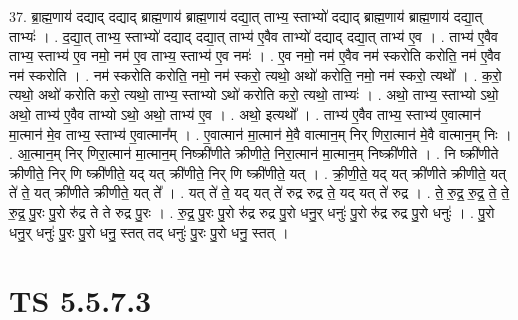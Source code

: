 \documentclass[17pt]{extarticle}
\begin{document}
37. ब्रा॒ह्म॒णाय॑ दद्याद् दद्याद् ब्राह्म॒णाय॑ ब्राह्म॒णाय॑ दद्या॒त् ताभ्य॒ स्ताभ्यो॑ दद्याद् ब्राह्म॒णाय॑ ब्राह्म॒णाय॑ दद्या॒त् ताभ्यः॑ । . द॒द्या॒त् ताभ्य॒ स्ताभ्यो॑ दद्याद् दद्या॒त् ताभ्य॑ ए॒वैव ताभ्यो॑ दद्याद् दद्या॒त् ताभ्य॑ ए॒व । . ताभ्य॑ ए॒वैव ताभ्य॒ स्ताभ्य॑ ए॒व नमो॒ नम॑ ए॒व ताभ्य॒ स्ताभ्य॑ ए॒व नमः॑ । . ए॒व नमो॒ नम॑ ए॒वैव नम॑ स्करोति करोति॒ नम॑ ए॒वैव नम॑ स्करोति । . नम॑ स्करोति करोति॒ नमो॒ नम॑ स्करो॒ त्यथो॒ अथो॑ करोति॒ नमो॒ नम॑ स्करो॒ त्यथो᳚ । . क॒रो॒ त्यथो॒ अथो॑ करोति करो॒ त्यथो॒ ताभ्य॒ स्ताभ्यो ऽथो॑ करोति करो॒ त्यथो॒ ताभ्यः॑ । . अथो॒ ताभ्य॒ स्ताभ्यो ऽथो॒ अथो॒ ताभ्य॑ ए॒वैव ताभ्यो ऽथो॒ अथो॒ ताभ्य॑ ए॒व । . अथो॒ इत्यथो᳚ । . ताभ्य॑ ए॒वैव ताभ्य॒ स्ताभ्य॑ ए॒वात्मान॑ मा॒त्मान॑ मे॒व ताभ्य॒ स्ताभ्य॑ ए॒वात्मान᳚म् । . ए॒वात्मान॑ मा॒त्मान॑ मे॒वै वात्मान॒म् निर् णिरा॒त्मान॑ मे॒वै वात्मान॒म् निः । . आ॒त्मान॒म् निर् णिरा॒त्मान॑ मा॒त्मान॒म् निष्क्री॑णीते क्रीणीते॒ निरा॒त्मान॑ मा॒त्मान॒म् निष्क्री॑णीते । . नि ष्क्री॑णीते क्रीणीते॒ निर् णि ष्क्री॑णीते॒ यद् यत् क्री॑णीते॒ निर् णि ष्क्री॑णीते॒ यत् । . क्री॒णी॒ते॒ यद् यत् क्री॑णीते क्रीणीते॒ यत् ते॑ ते॒ यत् क्री॑णीते क्रीणीते॒ यत् ते᳚ । . यत् ते॑ ते॒ यद् यत् ते॑ रुद्र रुद्र ते॒ यद् यत् ते॑ रुद्र । . ते॒ रु॒द्र॒ रु॒द्र॒ ते॒ ते॒ रु॒द्र॒ पु॒रः पु॒रो रु॑द्र ते ते रुद्र पु॒रः । . रु॒द्र॒ पु॒रः पु॒रो रु॑द्र रुद्र पु॒रो धनु॒र् धनुः॑ पु॒रो रु॑द्र रुद्र पु॒रो धनुः॑ । . पु॒रो धनु॒र् धनुः॑ पु॒रः पु॒रो धनु॒ स्तत् तद् धनुः॑ पु॒रः पु॒रो धनु॒ स्तत् । \newline
\pagebreak
{}

\section{ TS 5.5.7.3 }
\end{document}

